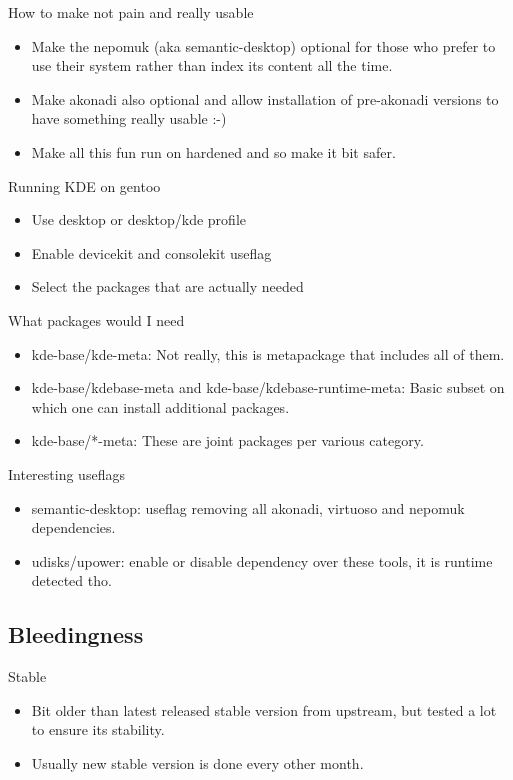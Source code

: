 \documentclass{beamer}
\begin{document}
\begin{frame}{How to make not pain and really usable}
	\begin{itemize}
		\item Make the nepomuk (aka semantic-desktop) optional for those who prefer to use their system rather than index its content all the time.
		\item Make akonadi also optional and allow installation of pre-akonadi versions to have something really usable :-)
		\item Make all this fun run on hardened and so make it bit safer.
	\end{itemize}
\end{frame}

\begin{frame}{Running KDE on gentoo}
	\begin{itemize}
		\item Use desktop or desktop/kde profile
		\item Enable devicekit and consolekit useflag
		\item Select the packages that are actually needed
	\end{itemize}
\end{frame}

\begin{frame}{What packages would I need}
	\begin{itemize}
		\item kde-base/kde-meta: Not really, this is metapackage that includes all of them.
		\item kde-base/kdebase-meta and kde-base/kdebase-runtime-meta: Basic subset on which one can install additional packages.
		\item kde-base/*-meta: These are joint packages per various category.
	\end{itemize}
\end{frame}

\begin{frame}{Interesting useflags}
	\begin{itemize}
		\item semantic-desktop: useflag removing all akonadi, virtuoso and nepomuk dependencies.
		\item udisks/upower: enable or disable dependency over these tools, it is runtime detected tho.
	\end{itemize}
\end{frame}

\subsection{Bleedingness}
\begin{frame}{Stable}
	\begin{itemize}
		\item Bit older than latest released stable version from upstream, but tested a lot to ensure its stability.
		\item Usually new stable version is done every other month.
	\end{itemize}
\end{frame}
\end{document}
